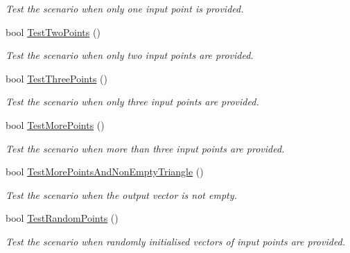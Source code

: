 \begin{DoxyCompactItemize}
\begin{DoxyCompactList}\small\item\em Test the scenario when only one input point is provided. \end{DoxyCompactList}\item 
bool \hyperlink{classmultiscaletest_1_1MinEnclosingTriangleFinderTest_a960264fec570c781efa0fb325714f347}{Test\-Two\-Points} ()
\begin{DoxyCompactList}\small\item\em Test the scenario when only two input points are provided. \end{DoxyCompactList}\item 
bool \hyperlink{classmultiscaletest_1_1MinEnclosingTriangleFinderTest_a2af4a9823e1a12390f71e6d0a2f97dc8}{Test\-Three\-Points} ()
\begin{DoxyCompactList}\small\item\em Test the scenario when only three input points are provided. \end{DoxyCompactList}\item 
bool \hyperlink{classmultiscaletest_1_1MinEnclosingTriangleFinderTest_a94579bc1f8e370dc5aaf8c9075fae541}{Test\-More\-Points} ()
\begin{DoxyCompactList}\small\item\em Test the scenario when more than three input points are provided. \end{DoxyCompactList}\item 
bool \hyperlink{classmultiscaletest_1_1MinEnclosingTriangleFinderTest_abc2b3c5f71876cfea21fa4dce51c0ef2}{Test\-More\-Points\-And\-Non\-Empty\-Triangle} ()
\begin{DoxyCompactList}\small\item\em Test the scenario when the output vector is not empty. \end{DoxyCompactList}\item 
bool \hyperlink{classmultiscaletest_1_1MinEnclosingTriangleFinderTest_aef8954ed38b8ce5709fe7a64d1c44648}{Test\-Random\-Points} ()
\begin{DoxyCompactList}\small\item\em Test the scenario when randomly initialised vectors of input points are provided. \end{DoxyCompactList}\end{DoxyCompactItemize}
